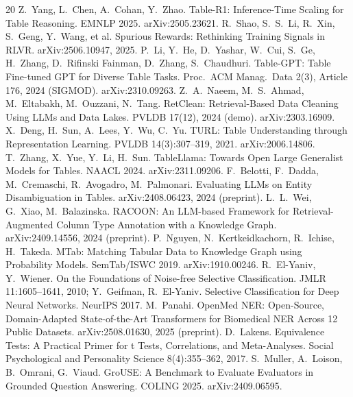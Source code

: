 \documentclass[11pt]{article}
\begin{document}
\begin{thebibliography}{20}
 Z.~Yang, L.~Chen, A.~Cohan, Y.~Zhao. Table-R1: Inference-Time
Scaling for Table Reasoning. EMNLP 2025. arXiv:2505.23621.
 R.~Shao, S.~S.~Li, R.~Xin, S.~Geng, Y.~Wang, et al. Spurious
Rewards: Rethinking Training Signals in RLVR. arXiv:2506.10947, 2025.
 P.~Li, Y.~He, D.~Yashar, W.~Cui, S.~Ge, H.~Zhang, D.~Rifinski
Fainman, D.~Zhang, S.~Chaudhuri. Table-GPT: Table Fine-tuned GPT for Diverse Table
Tasks. Proc.\ ACM Manag.\ Data 2(3), Article 176, 2024 (SIGMOD). arXiv:2310.09263.
 Z.~A.~Naeem, M.~S.~Ahmad, M.~Eltabakh, M.~Ouzzani, N.~Tang.
RetClean: Retrieval-Based Data Cleaning Using LLMs and Data Lakes. PVLDB 17(12), 2024
(demo). arXiv:2303.16909.
 X.~Deng, H.~Sun, A.~Lees, Y.~Wu, C.~Yu. TURL: Table Understanding
through Representation Learning. PVLDB 14(3):307--319, 2021. arXiv:2006.14806.
 T.~Zhang, X.~Yue, Y.~Li, H.~Sun. TableLlama: Towards Open Large
Generalist Models for Tables. NAACL 2024. arXiv:2311.09206.
 F.~Belotti, F.~Dadda, M.~Cremaschi, R.~Avogadro, M.~Palmonari.
Evaluating LLMs on Entity Disambiguation in Tables. arXiv:2408.06423, 2024 (preprint).
 L.~L.~Wei, G.~Xiao, M.~Balazinska. RACOON: An LLM-based Framework for
Retrieval-Augmented Column Type Annotation with a Knowledge Graph. arXiv:2409.14556,
2024 (preprint).
 P.~Nguyen, N.~Kertkeidkachorn, R.~Ichise, H.~Takeda. MTab: Matching
Tabular Data to Knowledge Graph using Probability Models. SemTab/ISWC 2019.
arXiv:1910.00246.
 R.~El-Yaniv, Y.~Wiener. On the Foundations of Noise-free Selective
Classification. JMLR 11:1605--1641, 2010; Y.~Geifman, R.~El-Yaniv. Selective
Classification for Deep Neural Networks. NeurIPS 2017.
 M.~Panahi. OpenMed NER: Open-Source, Domain-Adapted State-of-the-Art
Transformers for Biomedical NER Across 12 Public Datasets. arXiv:2508.01630, 2025
(preprint).
 D.~Lakens. Equivalence Tests: A Practical Primer for t Tests,
Correlations, and Meta-Analyses. Social Psychological and Personality Science
8(4):355--362, 2017.
 S.~Muller, A.~Loison, B.~Omrani, G.~Viaud. GroUSE: A Benchmark
to Evaluate Evaluators in Grounded Question Answering. COLING 2025.
arXiv:2409.06595.
\end{thebibliography}
\end{document}
